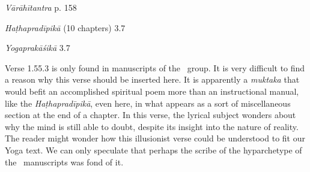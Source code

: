 \begin{ekdosis}
\begin{sources}[hp01_055_3]
\end{sources}

\begin{testimonia}[hp01_055_3]
\emph{Vārāhītantra} p. 158

\begin{versinnote}
\end{versinnote}

\emph{Haṭhapradīpikā} (10 chapters) 3.7

\begin{versinnote}
\end{versinnote}

\emph{Yogaprakāśikā} 3.7

\begin{versinnote}
\end{versinnote}

\end{testimonia}

\begin{philcomm}[hp01_055_3]
Verse 1.55.3 is only found in manuscripts of the \textdelta\ group. It is very difficult to find a reason why this verse should be inserted here. It is apparently a
\emph{muktaka} that would befit an accomplished spiritual poem more than an instructional manual, like the \emph{Haṭhapradīpikā}, even here, in what appears as a sort of miscellaneous section at the end of a chapter. In this verse, the lyrical subject wonders about why the mind is still able to doubt, despite its insight into the nature of reality. The reader might wonder how this illusionist verse could be understood to fit our Yoga text. We can only speculate that perhaps the scribe of the hyparchetype of the \textdelta\ manuscripts was fond of it.


\end{philcomm}
\end{ekdosis}
